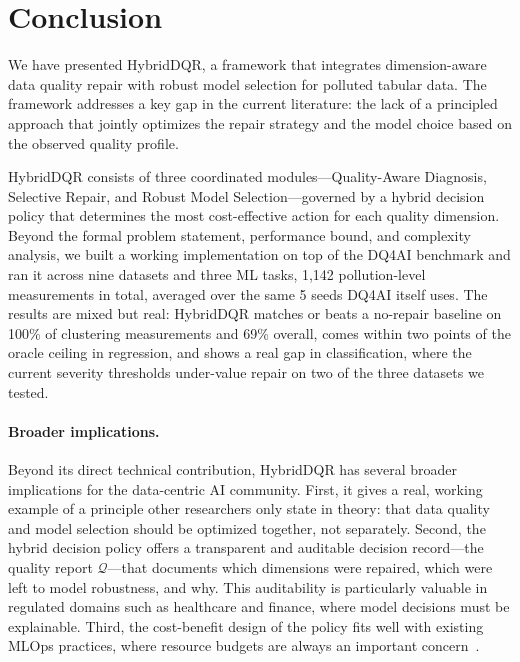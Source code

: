 \documentclass[runningheads]{llncs}
\begin{document}
\section{Conclusion}
\label{sec:conclusion}

We have presented HybridDQR, a framework that integrates
dimension-aware data quality repair with robust model selection
for polluted tabular data.
The framework addresses a key gap in the current literature:
the lack of a principled approach that jointly optimizes the
repair strategy and the model choice based on the observed
quality profile.

HybridDQR consists of three coordinated modules—Quality-Aware
Diagnosis, Selective Repair, and Robust Model Selection—governed
by a hybrid decision policy that determines the most cost-effective
action for each quality dimension.
Beyond the formal problem statement, performance bound, and
complexity analysis, we built a working implementation on top of
the DQ4AI benchmark and ran it across nine datasets and three ML
tasks, 1,142 pollution-level measurements in total, averaged over
the same 5 seeds DQ4AI itself uses. The results are mixed but
real: HybridDQR matches or beats a no-repair baseline on 100\% of
clustering measurements and 69\% overall, comes within two points
of the oracle ceiling in regression, and shows a real gap in
classification, where the current severity thresholds under-value
repair on two of the three datasets we tested.

\paragraph{Broader implications.}
Beyond its direct technical contribution, HybridDQR has several
broader implications for the data-centric AI community.
First, it gives a real, working example of a principle other
researchers only state in theory: that data quality and model
selection should be optimized together, not separately.
Second, the hybrid decision policy offers a transparent and
auditable decision record—the quality report $\mathcal{Q}$—that
documents which dimensions were repaired, which were left to
model robustness, and why.
This auditability is particularly valuable in regulated domains
such as healthcare and finance, where model decisions must be
explainable.
Third, the cost-benefit design of the policy fits well with
existing MLOps practices, where resource budgets are always an
important concern~\cite{whang2023data}.
\end{document}
